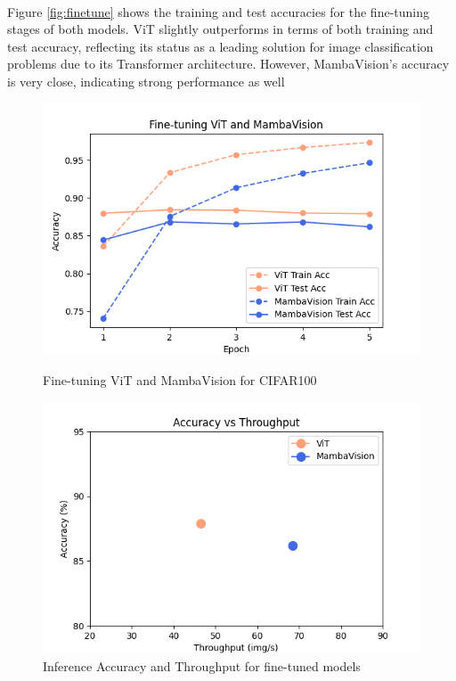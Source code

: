 \documentclass[12pt, conference, compsoc, onecolumn]{IEEEtran}
\begin{document}
	\hfill\\
	Figure \ref{fig:finetune} shows the training and test accuracies for the fine-tuning stages of both models. ViT slightly outperforms in terms of both training and test accuracy, reflecting its status as a leading solution for image classification problems due to its Transformer architecture. However, MambaVision's accuracy is very close, indicating strong performance as well
	
	\begin{figure}[H]
		\centering
		\begin{minipage}{0.49\textwidth}
			\centering
			\includegraphics[width=\linewidth]{figures/fine_tuning.png}
			\caption{Fine-tuning ViT and MambaVision for CIFAR100}
			\label{fig:finetune}
		\end{minipage}
		\hfill
		\begin{minipage}{0.49\textwidth}
			\centering
			\includegraphics[width=\linewidth]{figures/accuracy_vs_throughput.png}
			\caption{Inference Accuracy and Throughput for fine-tuned models}
			\label{fig:acc_throughput}
		\end{minipage}
	\end{figure}
	
\end{document}
